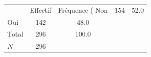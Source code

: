 {
\def\sym#1{\ifmmode^{#1}\else\(^{#1}\)\fi}
\begin{tabular}{l*{1}{cc}}
\toprule
            &    Effectif&Fréquence (%
\midrule
Non         &         154&        52.0\\
Oui         &         142&        48.0\\
Total       &         296&       100.0\\
\midrule
\(N\)       &         296&            \\
\bottomrule
\end{tabular}
}
